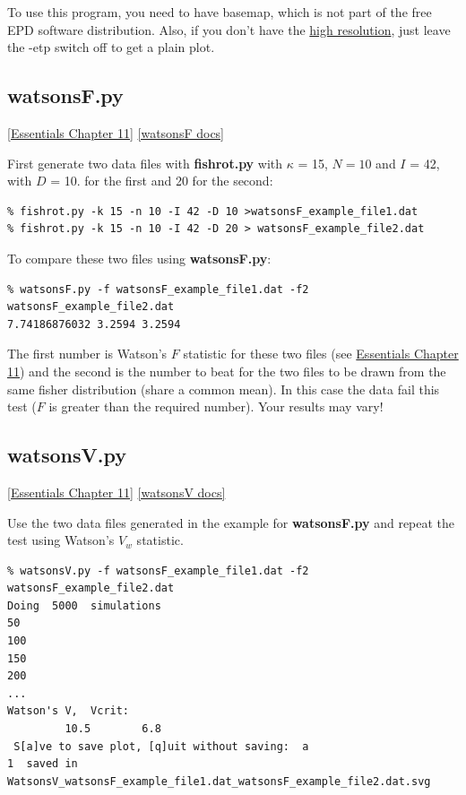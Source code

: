\documentclass[11pt]{book}
\begin{document}
{To use this program, you need to have basemap, which is not part of the free EPD software distribution.  Also, if you don't have the  \href{#hires}{high resolution}, just leave the -etp switch off to get a plain plot.


\subsection{watsonsF.py}
\href{http://earthref.org/MAGIC/books/Tauxe/Essentials/WebBook3ch11.html#ch11}{[Essentials Chapter 11]}
\href{https://github.com/PmagPy/PmagPy/blob/master/programs/watsonsF.py}{[watsonsF docs]}

First generate two data files with {\bf fishrot.py} with $\kappa$ = 15, $N=10$ and $I$ = 42, with $D$ = 10. for the first and 20 for the second:

\begin{verbatim}
% fishrot.py -k 15 -n 10 -I 42 -D 10 >watsonsF_example_file1.dat
% fishrot.py -k 15 -n 10 -I 42 -D 20 > watsonsF_example_file2.dat
\end{verbatim}

To compare these two files using {\bf watsonsF.py}:

\begin{verbatim}
% watsonsF.py -f watsonsF_example_file1.dat -f2 watsonsF_example_file2.dat
7.74186876032 3.2594 3.2594
\end{verbatim}

The first number is Watson's  $F$ statistic for these two files (see \href{http://earthref.org/MAGIC/books/Tauxe/Essentials/WebBook3ch11.html#ch11}{Essentials Chapter 11}) and the second is the number to beat for the two files to be drawn from the same fisher distribution (share a common mean).   In this case  the data fail this test ($F$ is greater than the required number).    Your results may vary!

\subsection{watsonsV.py}
\href{http://earthref.org/MAGIC/books/Tauxe/Essentials/WebBook3ch11.html#ch11}{[Essentials Chapter 11]}
\href{https://github.com/PmagPy/PmagPy/blob/master/programs/watsonsV.py}{[watsonsV docs]}


Use the two data files generated in the example for {\bf watsonsF.py} and repeat the test using Watson's $V_w$ statistic.

\begin{verbatim}
% watsonsV.py -f watsonsF_example_file1.dat -f2 watsonsF_example_file2.dat
Doing  5000  simulations
50
100
150
200
...
Watson's V,  Vcrit:
         10.5        6.8
 S[a]ve to save plot, [q]uit without saving:  a
1  saved in  WatsonsV_watsonsF_example_file1.dat_watsonsF_example_file2.dat.svg
       \end{verbatim}

}
\end{document}
